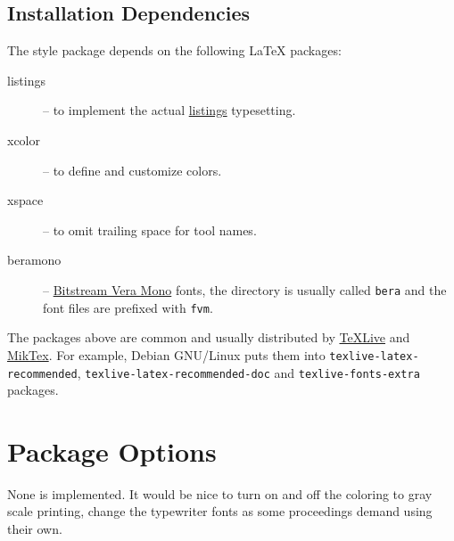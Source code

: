 \documentclass[english,paper=a4,final]{article}
\begin{document}
\subsection{Installation Dependencies}
The style package depends on the following \LaTeX{} packages:
\begin{description}
\item[listings] -- to implement the actual \href{https://www.ctan.org/pkg/listings}{listings} typesetting.
\item[xcolor] -- to define and customize colors.
\item[xspace] -- to omit trailing space for tool names.
\item[beramono] -- \href{http://www.tug.dk/FontCatalogue/beramono/}{Bitstream Vera Mono} fonts, the directory is usually called {\tt bera} and the font files are prefixed with {\tt fvm}.
\end{description}
The packages above are common and usually distributed by \href{https://www.tug.org/texlive/}{TeXLive} and \href{https://miktex.org/}{MikTex}.
For example, Debian GNU/Linux puts them into {\tt texlive-latex-recommended}, {\tt texlive-latex-recommended-doc} and {\tt texlive-fonts-extra} packages.


\section{Package Options}
None is implemented. It would be nice to turn on and off the coloring to gray scale printing, change the typewriter fonts as some proceedings demand using their own.
\end{document}
